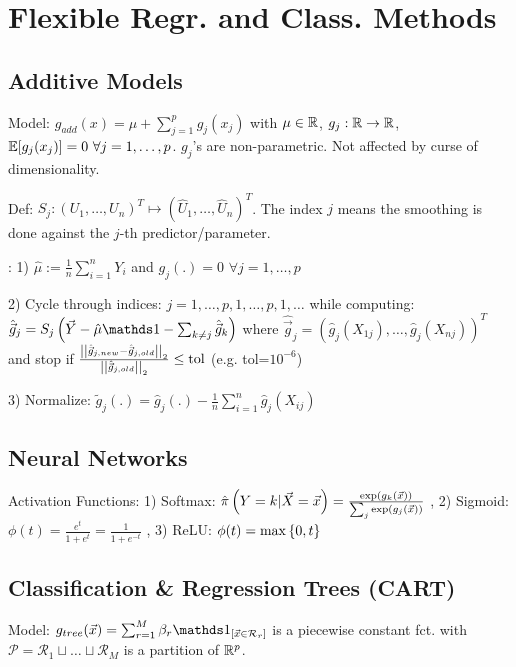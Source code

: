 \section{Flexible Regr. and Class. Methods}

\vspace{-5pt}

\subsection{Additive Models}
Model: $g_{add} (x) = \mu + \sum_{j=1}^p g_j (x_j)$ with $\mu \in \mathbb{R}$, $g_j : \mathbb{R} \rightarrow \mathbb{R}$, $\mathbb{E} [g_j (x_j)] = 0 \ \forall j=1,\dots,p$. $g_j$'s are non-parametric. Not affected by curse of dimensionality.

\vspace{5pt}

Def: $S_j : (U_1,\dots,U_n)^T \mapsto (\hat{U}_1,\dots,\hat{U}_n)^T$. The index $j$ means the smoothing is done against the $j$-th predictor/parameter.

: 1) $\hat{\mu} := \frac{1}{n} \sum_{i=1}^n Y_i$ and $g_j (.) = 0$ $\forall j=1,\dots,p$

2) Cycle through indices: $j=1,\dots,p,1,\dots,p,1,\dots$ while computing: $\hat{\vec{g}}_j = S_j \klammer{\vec{Y} - \hat{\mu} \id - \sum_{k \neq j} \hat{\vec{g}}_k}$ where $\hat{\vec{g}}_j = (\hat{g}_j (X_{1j}),\dots,\hat{g}_j (X_{nj}))^T$ and stop if $\frac{\left\vert\left\vert \hat{\vec{g}}_{j,new} - \hat{\vec{g}}_{j,old} \right\vert\right\vert_2}{\left\vert\left\vert \hat{\vec{g}}_{j,old} \right\vert\right\vert_2} \leq \text{tol}$ (e.g. tol=$10^{-6}$)

3) Normalize: $\tilde{g}_j (.) = \hat{g}_j (.) - \frac{1}{n} \sum_{i=1}^n \hat{g}_j (X_{ij})$

\vspace{-5pt}

\subsection{Neural Networks}
Activation Functions: 1) Softmax: $\hat{\pi} \left( Y=k | \vec{X} = \vec{x} \right) = \frac{\exp (g_k (\vec{x}))}{\sum_j \exp(g_j(\vec{x}))}$ , 2) Sigmoid: $\phi(t) = \frac{e^t}{1+e^t} = \frac{1}{1+e^{-t}}$ , 3) ReLU: $\phi(t) = \max \left\{ 0,t \right\}$

\vspace{-5pt}

\subsection{Classification \& Regression Trees (CART)}
Model: $g_{tree} (\vec{x}) = \sum_{r=1}^M \beta_r \id_{[\vec{x} \in \mathcal{R}_r]}$ is a piecewise constant fct. with $\mathcal{P} = \mathcal{R}_1 \sqcup \dots \sqcup \mathcal{R}_M$ is a partition of $\mathbb{R}^p$.

